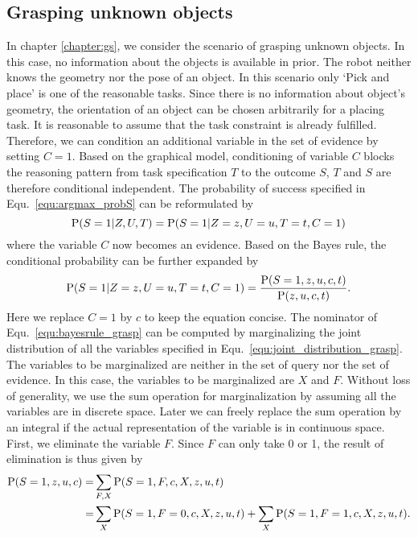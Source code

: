 \subsection{Grasping unknown objects} 
In chapter \ref{chapter:gs}, we consider the scenario of grasping unknown objects. In this case, no information about the objects is available in prior. The robot neither knows the geometry nor the pose of an object. In this scenario only `Pick and place' is one of the reasonable tasks. Since there is no information about object's geometry, the orientation of an object can be chosen arbitrarily for a placing task. It is reasonable to assume that the task constraint is already fulfilled. Therefore, we can condition an additional variable in the set of evidence by setting $C = 1$. Based on the graphical model, conditioning of variable $C$ blocks the reasoning pattern from task specification $T$ to the outcome $S$, $T$ and $S$ are therefore conditional independent. The probability of success specified in Equ.~\ref{equ:argmax_probS} can be reformulated by 
\begin{equation}
\operatorname*{\text{P}} (S = 1| Z, U ,T) = \operatorname*{\text{P}}(S = 1|Z=z,U=u,T=t, C=1)
\end{equation}
where the variable $C$ now becomes an evidence. Based on the Bayes rule, the conditional probability can be further expanded by
\begin{equation}
 \operatorname*{\text{P}}(S = 1|Z=z,U=u,T=t,C=1) = \frac{ \operatorname*{\text{P}}(S = 1,z,u,c,t)}{\operatorname*{\text{P}}(z,u,c,t)}.
 \label{equ:bayesrule_grasp}
\end{equation}
Here we replace $C=1$ by $c$ to keep the equation concise. The nominator of Equ.~\ref{equ:bayesrule_grasp} can be computed by marginalizing the joint distribution of all the variables specified in Equ.~\ref{equ:joint_distribution_grasp}. The variables to be marginalized are neither in the set of query nor  the set of evidence. In this case, the variables to be marginalized are $X$ and $F$. Without loss of generality, we use the sum operation for marginalization by assuming all the variables are in discrete space. Later we can freely replace the sum operation by an integral if the actual representation of the variable is in continuous space. First, we eliminate the variable $F$. Since $F$ can only take 0 or 1, the result of elimination is thus given by 
\begin{equation}
\begin{split}
\operatorname*{\text{P}}(S = 1,z,u,c) =& \sum_{F,X} \operatorname*{\text{P}} (S=1,F,c,X,z,u,t)  \\
                 =& \sum_{X}  \operatorname*{\text{P}} (S=1, F = 0, c ,X, z,u,t) + \sum_{X}  \operatorname*{\text{P}} (S=1,F=1,c,X,z,u,t).                  
\end{split}
\label{equ:elimination}
\end{equation}
